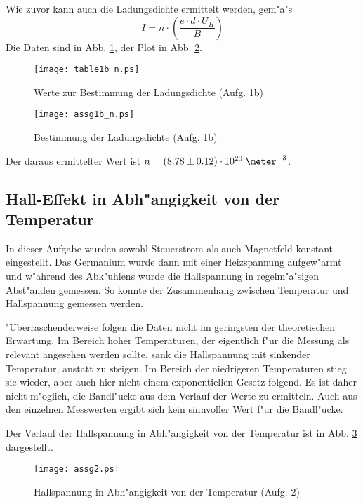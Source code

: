 \documentclass[a4paper,10pt]{article}
\begin{document}
Wie zuvor kann auch die Ladungsdichte ermittelt werden, gem"a"s
\begin{equation}
I = n \cdot \left( \frac{e \cdot d \cdot U_H}{B} \right)
\end{equation}
Die Daten sind in Abb. \ref{table1b_n}, der Plot in Abb. \ref{plot1b_n}.
\begin{figure}[p]
    \centering
    \texttt{[image: table1b\_n.ps]}
\caption{Werte zur Bestimmung der Ladungsdichte (Aufg. 1b)}
\label{table1b_n}
\end{figure}
\begin{figure}[p]
    \centering
         \texttt{[image: assg1b\_n.ps]}
         \caption{Bestimmung der Ladungsdichte (Aufg. 1b)}
       \label{plot1b_n}
\end{figure}
Der daraus ermittelter Wert ist $n = (8.78 \pm 0.12) \cdot 10^{20}\; \meter^{-3}$.



\subsection{Hall-Effekt in Abh"angigkeit von der Temperatur}
In dieser Aufgabe wurden sowohl Steuerstrom als auch Magnetfeld konstant eingestellt. Das Germanium wurde dann mit einer Heizspannung aufgew"armt und w"ahrend des Abk"uhlens wurde die Hallspannung in regelm"a"sigen Abst"anden gemessen. So konnte der Zusammenhang zwischen Temperatur und Hallspannung gemessen werden.

"Uberraschenderweise folgen die Daten nicht im geringsten der theoretischen Erwartung. Im Bereich hoher Temperaturen, der eigentlich f"ur die Messung als relevant angesehen werden sollte, sank die Hallspannung mit sinkender Temperatur, anstatt zu steigen. Im Bereich der niedrigeren Temperaturen stieg sie wieder, aber auch hier nicht einem exponentiellen Gesetz folgend. Es ist daher nicht m"oglich, die Bandl"ucke aus dem Verlauf der Werte zu ermitteln. Auch aus den einzelnen Messwerten ergibt sich kein sinnvoller Wert f"ur die Bandl"ucke.

Der Verlauf der Hallspannung in Abh"angigkeit von der Temperatur ist in Abb. \ref{plot2} dargestellt.
\begin{figure}[p]
    \centering
         \texttt{[image: assg2.ps]}
         \caption{Hallspannung in Abh"angigkeit von der Temperatur (Aufg. 2)}
       \label{plot2}
\end{figure}
\end{document}
